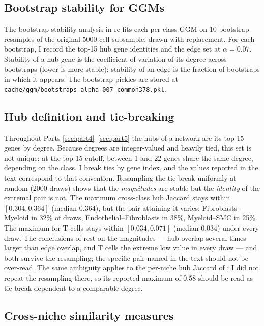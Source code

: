 \subsection*{Bootstrap stability for GGMs}

The bootstrap stability analysis in  re-fits each per-class GGM on 10 bootstrap resamples of the original 5000-cell subsample, drawn with replacement. For each bootstrap, I record the top-15 hub gene identities and the edge set at $\alpha = 0.07$. Stability of a hub gene is the coefficient of variation of its degree across bootstraps (lower is more stable); stability of an edge is the fraction of bootstraps in which it appears. The bootstrap pickles are stored at \texttt{cache/ggm/bootstraps\_alpha\_007\_common378.pkl}.

\subsection*{Hub definition and tie-breaking}

Throughout Parts \ref{sec:part4}--\ref{sec:part5} the hubs of a network are its top-15 genes by degree. Because degrees are integer-valued and heavily tied, this set is not unique: at the top-15 cutoff, between 1 and 22 genes share the same degree, depending on the class. I break ties by gene index, and the values reported in the text correspond to that convention. Resampling the tie-break uniformly at random (2000 draws) shows that the \emph{magnitudes} are stable but the \emph{identity} of the extremal pair is not. The maximum cross-class hub Jaccard stays within $[0.304, 0.364]$ (median $0.364$), but the pair attaining it varies: Fibroblasts--Myeloid in 32\% of draws, Endothelial--Fibroblasts in 38\%, Myeloid--SMC in 25\%. The maximum for T cells stays within $[0.034, 0.071]$ (median $0.034$) under every draw. The conclusions of  rest on the magnitudes --- hub overlap several times larger than edge overlap, and T cells the extreme low value in every draw --- and both survive the resampling; the specific pair named in the text should not be over-read. The same ambiguity applies to the per-niche hub Jaccard of ; I did not repeat the resampling there, so its reported maximum of $0.58$ should be read as tie-break dependent to a comparable degree.

\subsection*{Cross-niche similarity measures}

